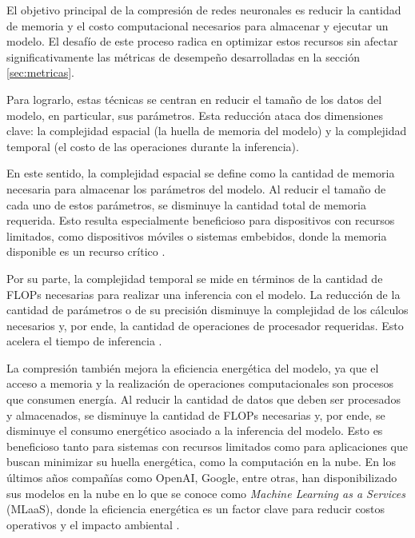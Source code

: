 
El objetivo principal de la compresión de redes neuronales es reducir la cantidad de memoria y el costo computacional necesarios para almacenar y ejecutar un modelo. El desafío de este proceso radica en optimizar estos recursos sin afectar significativamente las métricas de desempeño desarrolladas en la sección \ref{sec:metricas}.

Para lograrlo, estas técnicas se centran en reducir el tamaño de los datos del modelo, en particular, sus parámetros. Esta reducción ataca dos dimensiones clave: la complejidad espacial (la huella de memoria del modelo) y la complejidad temporal (el costo de las operaciones durante la inferencia).

En este sentido, la complejidad espacial se define como la cantidad de memoria necesaria para almacenar los parámetros del modelo. Al reducir el tamaño de cada uno de estos parámetros, se disminuye la cantidad total de memoria requerida. Esto resulta especialmente beneficioso para dispositivos con recursos limitados, como dispositivos móviles o sistemas embebidos, donde la memoria disponible es un recurso crítico \cite{DBLP:journals/corr/abs-2010-03954}.

Por su parte, la complejidad temporal se mide en términos de la cantidad de FLOPs necesarias para realizar una inferencia con el modelo. La reducción de la cantidad de parámetros o de su precisión disminuye la complejidad de los cálculos necesarios y, por ende, la cantidad de operaciones de procesador requeridas. Esto acelera el tiempo de inferencia \cite{molchanov2017pruning}.

La compresión también mejora la eficiencia energética del modelo, ya que el acceso a memoria y la realización de operaciones computacionales son procesos que consumen energía. Al reducir la cantidad de datos que deben ser procesados y almacenados, se disminuye la cantidad de FLOPs necesarias y, por ende, se disminuye el consumo energético asociado a la inferencia del modelo. Esto es beneficioso tanto para sistemas con recursos limitados como para aplicaciones que buscan minimizar su huella energética, como la computación en la nube. En los últimos años compañías como OpenAI, Google, entre otras, han disponibilizado sus modelos en la nube en lo que se conoce como \textit{Machine Learning as a Services} (MLaaS), donde la eficiencia energética es un factor clave para reducir costos operativos y el impacto ambiental \cite{barros2024scheduling}.

